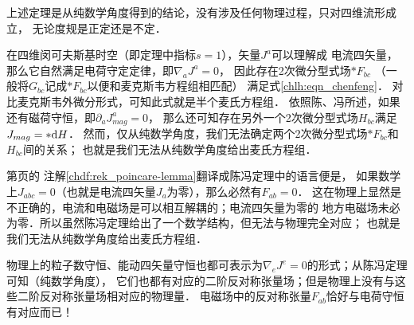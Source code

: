 \begin{remark}
    上述定理是从纯数学角度得到的结论，没有涉及任何物理过程，只对四维流形成立，
    无论度规是正定还是不定．
\end{remark}
\begin{remark}
    在四维闵可夫斯基时空（即定理中指标$s=1$），矢量$J^a$可以理解成
    电流四矢量，那么它自然满足电荷守定定律，即$\nabla_a J^a=0$，
    因此存在2次微分型式场$*{F_{bc}}$ （一般将${G_{bc}}$记成$*{F_{bc}}$以便和麦克斯韦方程组相匹配）
    满足式\eqref{chlh:eqn_chenfeng}．
    对比麦克斯韦外微分形式，可知此式就是半个麦氏方程组．
    依照陈、冯\cite{chen-feng1989-cn}所述，如果还有磁荷守恒，即$\partial_a J^a_{mag}=0$，
    那么还可知存在另外一个2次微分型式场$H_{bc}$满足$J_{mag} = *{\rm d}H$．
    然而，仅从纯数学角度，我们无法确定两个2次微分型式场$*F_{bc}$和$H_{bc}$间的关系；
    也就是我们无法从纯数学角度给出麦氏方程组．
\end{remark}
\begin{remark}
    第\pageref{chdf:rek_poincare-lemma}页的
    注解\ref{chdf:rek_poincare-lemma}翻译成陈冯定理中的语言便是，
    如果数学上$J_{abc}=0$（也就是电流四矢量$J_{a}$为零），那么必然有$F_{ab}=0$．
    这在物理上显然是不正确的，电流和电磁场是可以相互解耦的；电流四矢量为零的
    地方电磁场未必为零．所以虽然陈冯定理给出了一个数学结构，但无法与物理完全对应；
    也就是我们无法从纯数学角度给出麦氏方程组．
\end{remark}
\begin{remark}
    物理上的粒子数守恒、能动四矢量守恒也都可表示为$\nabla_e J^e=0$的形式；从陈冯定理可知（纯数学角度），
    它们也都有对应的二阶反对称张量场；但是物理上没有与这些二阶反对称张量场相对应的物理量．
    电磁场中的反对称张量$F_{ab}$恰好与电荷守恒有对应而已！
\end{remark}











